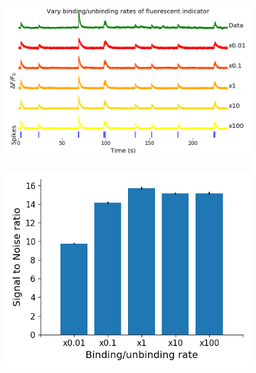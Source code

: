 \begin{figure}[p]
\centering
    \begin{subfigure}{0.9\textwidth}
        \includegraphics[width=\linewidth]{figures/calcium_chapter/b_i_f_i_perturbed_fluorescence_18_paper.png}
        \caption{}
        \label{fig:rates_perturbed_fluorescence}
    \end{subfigure}
    \newline
    \begin{subfigure}{0.45\textwidth}
        \includegraphics[width=\linewidth]{figures/calcium_chapter/b_i_f_i_perturbed_snr.png}
        \caption{}
        \label{fig:rates_perturbed_snr}
    \end{subfigure}
    \begin{subfigure}{0.45\textwidth}

\end{subfigure}
\end{figure}
